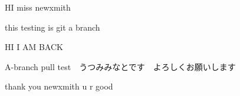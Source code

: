 \documentclass[a4 paper,12pt]{article}
\begin{document}
HI  miss newxmith

this testing is git a branch

HI I AM BACK

A-branch pull test　うつみみなとです　よろしくお願いします

thank you newxmith u r good
\end{document}
